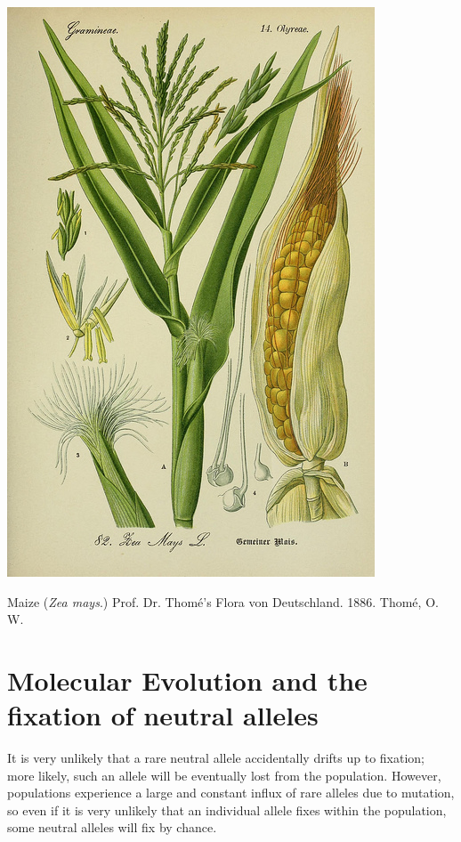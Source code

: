 \begin{marginfigure}
\begin{center}
  \includegraphics[width = \textwidth]{illustration_images/Genetic_drift/maize/7845339168_66aa3d8ccc_z.jpg}
\end{center}
\caption{Maize ({\it Zea mays}.) Prof. Dr. Thomé's Flora von
  Deutschland. 1886. Thomé, O. W. } \label{fig:maize}  %
\end{marginfigure}



\section{Molecular Evolution and the fixation of neutral alleles} 
It is very unlikely that a rare
neutral allele accidentally drifts up to fixation; more likely, such an allele
will be eventually lost from the population. However, populations experience a
large and constant influx of rare alleles due to mutation, so even if it is
very unlikely that an individual allele fixes within the population, some
neutral alleles will fix by chance.  \\


